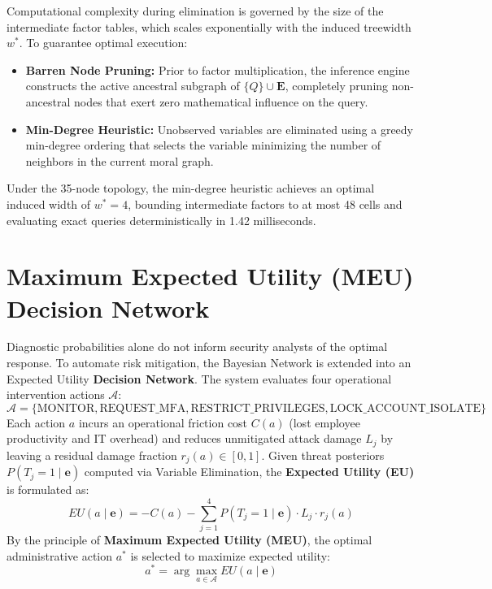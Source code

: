 \documentclass[12pt,a4paper]{report}
\begin{document}
Computational complexity during elimination is governed by the size of the intermediate factor tables, which scales exponentially with the induced treewidth $w^*$. To guarantee optimal execution:
\begin{itemize}
    \item \textbf{Barren Node Pruning:} Prior to factor multiplication, the inference engine constructs the active ancestral subgraph of $\{Q\} \cup \mathbf{E}$, completely pruning non-ancestral nodes that exert zero mathematical influence on the query.
    \item \textbf{Min-Degree Heuristic:} Unobserved variables are eliminated using a greedy min-degree ordering that selects the variable minimizing the number of neighbors in the current moral graph.
\end{itemize}
Under the 35-node topology, the min-degree heuristic achieves an optimal induced width of $w^* = 4$, bounding intermediate factors to at most 48 cells and evaluating exact queries deterministically in 1.42 milliseconds.

\section{Maximum Expected Utility (MEU) Decision Network}
Diagnostic probabilities alone do not inform security analysts of the optimal response. To automate risk mitigation, the Bayesian Network is extended into an Expected Utility \textbf{Decision Network}. The system evaluates four operational intervention actions $\mathcal{A}$:
\begin{equation}
\mathcal{A} = \{\text{MONITOR}, \text{REQUEST\_MFA}, \text{RESTRICT\_PRIVILEGES}, \text{LOCK\_ACCOUNT\_ISOLATE}\}
\end{equation}
Each action $a$ incurs an operational friction cost $C(a)$ (lost employee productivity and IT overhead) and reduces unmitigated attack damage $L_j$ by leaving a residual damage fraction $r_j(a) \in [0, 1]$. Given threat posteriors $P(T_j = 1 \mid \mathbf{e})$ computed via Variable Elimination, the \textbf{Expected Utility (EU)} is formulated as:
\begin{equation}
EU(a \mid \mathbf{e}) = -C(a) - \sum_{j=1}^4 P(T_j = 1 \mid \mathbf{e}) \cdot L_j \cdot r_j(a)
\label{eq:expected_utility}
\end{equation}
By the principle of \textbf{Maximum Expected Utility (MEU)}, the optimal administrative action $a^*$ is selected to maximize expected utility:
\begin{equation}
a^* = \arg\max_{a \in \mathcal{A}} EU(a \mid \mathbf{e})
\label{eq:meu_action}
\end{equation}
\end{document}
